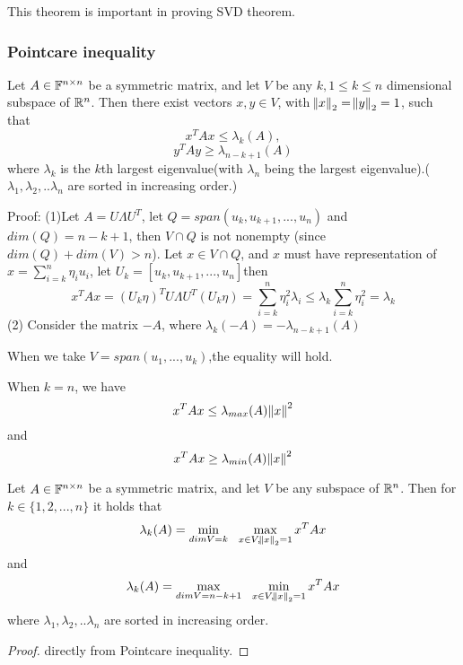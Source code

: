 \begin{refsection}
\begin{remark}
	This theorem is important in proving SVD theorem.
\end{remark}

\subsubsection{Pointcare inequality}

\begin{theorem}\label{ch:linearalgebra:th:pointcareinequality}
	\cite[126]{calafiore2014optimization} Let $A\in \mathbb{F}^{n\times n}$ be a symmetric matrix, and let $V$ be any $k,1\leq k\leq n$ dimensional subspace of $\mathbb{R}^n$. Then there exist vectors $x,y\in V$, with $\norm{x}_2 = \norm{y}_2 = 1$, such that
	$$x^TAx \leq \lambda_k(A),$$
	$$ y^TAy \geq \lambda_{n-k+1}(A)$$
	where $\lambda_k$ is the $k$th largest eigenvalue(with $\lambda_n$ being the largest eigenvalue).( $\lambda_1,\lambda_2,..\lambda_n$ are sorted in increasing order.)
\end{theorem}
Proof: (1)Let $A = U\Lambda U^T$, let $Q = span(u_k,u_{k+1},...,u_n)$ and $dim(Q) = n-k+1$, then $V\cap Q$ is not nonempty (since $dim(Q) + dim(V) > n$). Let $x\in V\cap Q$, and $x$ must have representation of $x = \sum_{i=k}^n \eta_i u_i$, let $U_k = [u_k,u_{k+1},...,u_n]$then
$$x^TAx = (U_k \eta)^T U\Lambda U^T (U_k \eta) = \sum_{i=k}^n \eta_i^2 \lambda_i \leq \lambda_k \sum_{i=k}^n \eta_i^2 = \lambda_k$$
(2) Consider the matrix $-A$, where $\lambda_k(-A) = -\lambda_{n-k+1}(A)$


\begin{remark}
	When we take $V = span(u_1,...,u_k)$,the equality will hold.
\end{remark}

\begin{remark}
	When $k=n$, we have 
	$$x^TAx \leq \lambda_{max}(A)\norm{x}^2$$
	and
	$$x^TAx \geq \lambda_{min}(A)\norm{x}^2$$
\end{remark}


\begin{corollary}
	\cite{wiki:minmax}\cite[127]{calafiore2014optimization}\cite[237]{horn2012matrix} Let $A\in \mathbb{F}^{n\times n}$ be a symmetric matrix, and let $V$ be any subspace of $\mathbb{R}^n$. Then for $k\in \{1,2,...,n\}$ it holds that
	$$\lambda_k(A) = \min_{dim V = k} ~~ \max_{x\in V,\norm{x}_2 = 1} x^TAx $$
	and
	$$\lambda_k(A) = \max_{dim V = n-k+1} ~~ \min_{x\in V,\norm{x}_2 = 1} x^TAx$$
	where $\lambda_1,\lambda_2,..\lambda_n$ are sorted in increasing order.
\end{corollary}
\begin{proof}
	directly from Pointcare inequality.
\end{proof}



\end{refsection}
